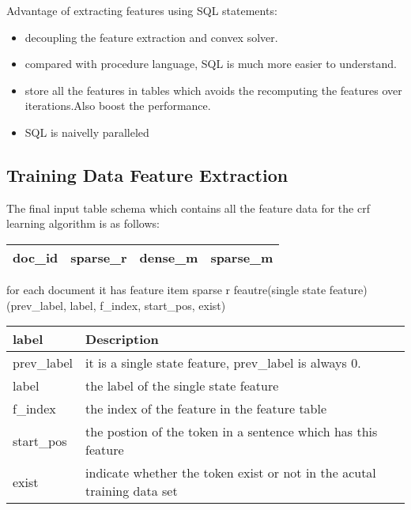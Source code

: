 Advantage of extracting features using SQL statements:
\begin{itemize}
\item decoupling the feature extraction and convex solver.
\item compared with procedure language, SQL is much more easier to understand.
\item store all the features in tables which avoids the recomputing the features over iterations.Also boost the performance.
\item SQL is naivelly paralleled
\end{itemize}

\subsection{Training Data Feature Extraction}
The final input table schema which contains all the feature data for the crf learning algorithm is as follows:
\begin{center}
    \begin{tabular}{ | l | l | l | l |}
    \hline
    doc\_id & sparse\_r & dense\_m & sparse\_m \\ 
    \hline
    \end{tabular}
\end{center}

for each document it has feature item
sparse r feautre(single state feature) \\
(prev\_label, label, f\_index, start\_pos, exist)

\begin{center}
    \begin{tabular}{ | l | l |}
    \hline
    label & Description \\ \hline
    prev\_label & it is a single state feature, prev\_label is always 0.\\ 
    label       & the label of the single state feature\\
    f\_index    & the index of the feature in the feature table\\
    start\_pos  & the postion of the token in a sentence which has this feature\\
    exist       & indicate whether the token exist or not in the acutal training data set\\
    \hline
    \end{tabular}
\end{center}

